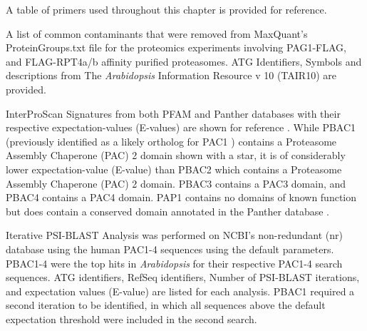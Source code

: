 \begin{table}
	\centering
	{A table of primers used throughout this chapter is provided for reference.}
\begingroup
\let\clearpage\relax
\scalebox{0.7}{

}
\endgroup
\npnoround
\label{table:primers}
\end{table}
\clearpage

\begin{table}[h]
	\centering
	{A list of common contaminants that were removed from MaxQuant's ProteinGroups.txt file for the proteomics experiments involving PAG1-FLAG, and FLAG-RPT4a/b affinity purified proteasomes.  ATG Identifiers, Symbols and descriptions from The \textit{Arabidopsis} Information Resource v 10 (TAIR10) are provided.}
\begingroup
\let\clearpage\relax
\scalebox{1}{

}
\endgroup
\npnoround
\label{table:contam}
\end{table}
\clearpage

\begin{table}
	\centering
	{InterProScan Signatures from both PFAM and Panther databases with their respective expectation-values (E-values) are shown for reference \citep{jones14}. While PBAC1 (previously identified as a likely ortholog for PAC1 \citep{kusmierczyk11}) contains a Proteasome Assembly Chaperone (PAC) 2 domain shown with a star, it is of considerably lower expectation-value (E-value) than PBAC2 which contains a Proteasome Assembly Chaperone (PAC) 2 domain. PBAC3 contains a PAC3 domain, and PBAC4 contains a PAC4 domain. PAP1 contains no domains of known function but does contain a conserved domain annotated in the Panther database \citep{mi05}.}
\begingroup
\let\clearpage\relax
\scalebox{0.7}{

}
\endgroup
\npnoround
\label{table:ipro}
\end{table}
\clearpage

\begin{table}[h]
	\centering
	{Iterative PSI-BLAST Analysis was performed on NCBI's non-redundant (nr) database using the human PAC1-4 sequences using the default parameters. PBAC1-4 were the top hits in \textit{Arabidopsis} for their respective PAC1-4 search sequences. ATG identifiers, RefSeq identifiers, Number of PSI-BLAST iterations, and expectation values (E-value) are listed for each analysis. PBAC1 required a second iteration to be identified, in which all sequences above the default expectation threshold were included in the second search.}
\begingroup
\let\clearpage\relax
\scalebox{1}{

}
\endgroup
\npnoround
\label{table:psiblast}
\end{table}
\clearpage

